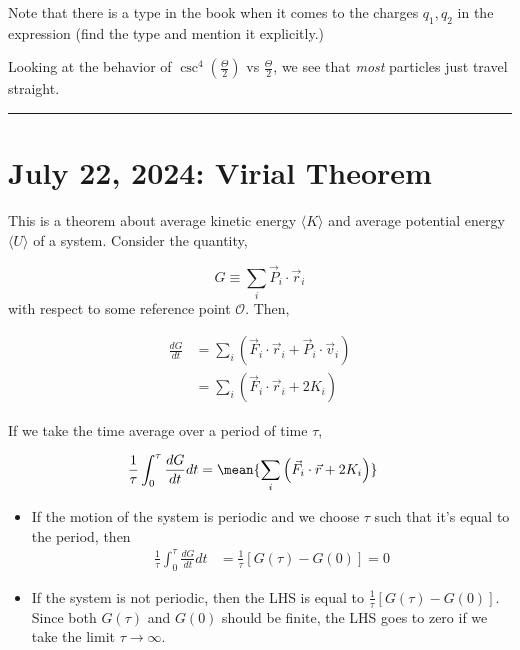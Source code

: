 \documentclass[11pt]{article}
\begin{document}
\begin{redbox}
  Note that there is a type in the book when it comes to the charges $q_1, q_2$ in the expression (find the type and mention it explicitly.)
\end{redbox}

\vskip 0.5cm
Looking at the behavior of $\csc^4 \left(\frac{\Theta}{2}\right)$ vs $\frac{\Theta}{2}$, we see that \emph{most} particles just travel straight.
\hrule

\pagebreak
\section{July 22, 2024: Virial Theorem}

This is a theorem about average kinetic energy $\langle K \rangle$ and average potential energy $\langle U \rangle$ of a system. Consider the quantity,

\[ G \equiv \sum_{i} \vec{P}_i \cdot \vec{r}_i \]
with respect to some reference point $\mathcal{O}$. Then,

\begin{align*}
  \frac{dG}{dt} &= \sum_i \left( \vec{F}_i \cdot \vec{r}_i + \vec{P}_i \cdot \vec{v}_i \right) \\
  &= \sum_i \left( \vec{F}_i \cdot \vec{r}_i + 2 K_i \right)
\end{align*}

If we take the time average over a period of time $\tau$, 

\begin{align*}
  \frac{1}{\tau} \int_{0}^{\tau} \frac{dG}{dt} dt &= \mean{ \sum_i \left( \vec{F}_i \cdot \vec{r} + 2 K_i \right) }
\end{align*}

\begin{itemize}
  \item If the motion of the system is periodic and we choose $\tau$ such that it's equal to the period, then 
  \begin{align*}
    \frac{1}{\tau} \int_{0}^{\tau} \frac{dG}{dt} dt &= \frac{1}{\tau} \left[ G(\tau) - G(0) \right] = 0
  \end{align*}

  \vskip 0.5cm
  \item If the system is not periodic, then the LHS is equal to 
  $\frac{1}{\tau} \left[G(\tau) - G(0)\right]$. Since both $G(\tau)$ and $G(0)$ should be finite, the LHS goes to zero if we take the limit $\tau \rightarrow \infty$.
\end{itemize}
\end{document}
